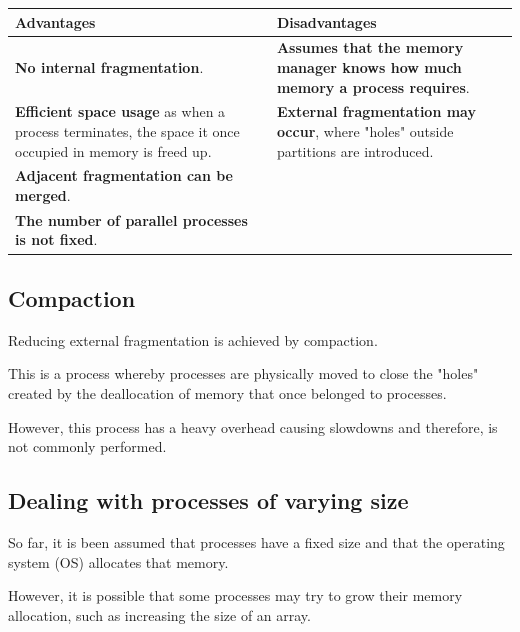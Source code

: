 \documentclass[a4paper]{systems-software}
\begin{document}
\begin{longtabu} to \textwidth {| X[1,l] | X[1,l] |}
    \hline
    \textbf{Advantages} & \textbf{Disadvantages}
	\\ \hline
	\textbf{No internal fragmentation}. & \textbf{Assumes that the memory manager knows how much memory a process requires}.
	\\ \hline
	\textbf{Efficient space usage} as when a process terminates, the space it once occupied in memory is freed up. & \textbf{External fragmentation may occur}, where "holes" outside partitions are introduced.
	\\ \hline
	\textbf{Adjacent fragmentation can be merged}. &
	\\ \hline
	\textbf{The number of parallel processes is not fixed}. &
	\\ \hline
\end{longtabu}


\subsection*{Compaction}

Reducing external fragmentation is achieved by compaction.

This is a process whereby processes are physically moved to close the "holes" created by the deallocation of memory that once belonged to processes.

However, this process has a heavy overhead causing slowdowns and therefore, is not commonly performed.


\subsection*{Dealing with processes of varying size}

So far, it is been assumed that processes have a fixed size and that the operating system (OS) allocates that memory.

However, it is possible that some processes may try to grow their memory allocation, such as increasing the size of an array.
\end{document}
